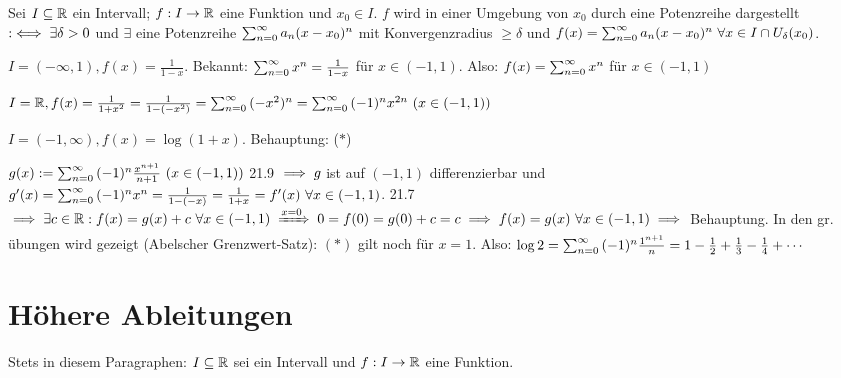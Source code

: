\documentclass[a4paper,oneside,DIV15,BCOR12mm]{scrbook}
\begin{document}
\begin{definition}
Sei $I \subseteq \mathbb{R}$ ein Intervall; $f:I\to\mathbb{R}$ eine Funktion und $x_0\in I$. $f$ wird in einer Umgebung von $x_0$ durch eine Potenzreihe dargestellt $:\iff \exists \delta>0$ und $\exists$ eine Potenzreihe $\sum_{n=0}^{\infty}{a_n(x-x_0)^n}$ mit Konvergenzradius $\ge \delta$ und $f(x)=\sum_{n=0}^{\infty}{a_n(x-x_0)^n}\ \forall x \in I \cap U_{\delta}(x_0)$.
\end{definition}

\begin{beispiele}
\item $I=(-\infty, 1), f(x)=\frac{1}{1-x}.$ Bekannt: $\sum_{n=0}^{\infty}{x^n}=\frac{1}{1-x}$ für $x \in (-1, 1)$. Also: $f(x)=\sum_{n=0}^{\infty}{x^n}$ für $x \in (-1, 1)$
\item $I=\MdR, f(x)=\frac{1}{1+x^2}=\frac{1}{1-(-x^2)}=\reihenull{(-x^2)^n}=\reihenull{(-1)^nx^{2n}}\ (x\in(-1, 1))$
\item $I=(-1, \infty), f(x)=\log(1+x).$ Behauptung: ($*$) \\
\begin{beweis}
$g(x):=\sum_{n=0}^{\infty}{(-1)^n\frac{x^{n+1}}{n+1}}\ (x \in (-1, 1))$ 21.9 $\implies g$ ist auf $(-1, 1)$ differenzierbar und $g'(x)=\reihenull{(-1)^nx^n}=\frac{1}{1-(-x)}=\frac{1}{1+x}=f'(x)\ \forall x \in (-1, 1)$. 21.7 $\folgt \exists c \in \MdR: f(x)=g(x)+c\ \forall x \in (-1, 1) \folgtwegen{x=0}0=f(0)=g(0)+c=c\folgt f(x)=g(x)\ \forall x \in (-1, 1) \folgt$ Behauptung.
In den gr. übungen wird gezeigt (Abelscher Grenzwert-Satz): $(*)$ gilt noch für $x=1$. Also: $\log 2=\sum_{n=0}^{\infty}{(-1)^n\frac{1^{n+1}}{n}}=1-\frac{1}{2}+\frac{1}{3}-\frac{1}{4}+\cdots$
\end{beweis}
\end{beispiele}


\chapter{Höhere Ableitungen}

Stets in diesem Paragraphen: $I \subseteq \mathbb{R}$ sei ein Intervall und $f: I \to \mathbb{R}$ eine Funktion.
\end{document}
